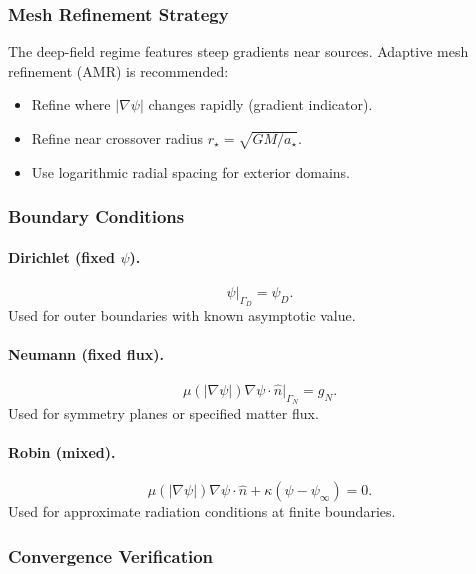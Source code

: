\subsubsection{Mesh Refinement Strategy}

The deep-field regime features steep gradients near sources. Adaptive mesh 
refinement (AMR) is recommended:
\begin{itemize}
\item Refine where $|\nabla\psi|$ changes rapidly (gradient indicator).
\item Refine near crossover radius $r_\star = \sqrt{GM/a_\star}$.
\item Use logarithmic radial spacing for exterior domains.
\end{itemize}

\subsubsection{Boundary Conditions}

\paragraph{Dirichlet (fixed $\psi$).}
\begin{equation}
\psi|_{\Gamma_D} = \psi_D.
\end{equation}
Used for outer boundaries with known asymptotic value.

\paragraph{Neumann (fixed flux).}
\begin{equation}
\mu(|\nabla\psi|)\nabla\psi \cdot \hat{n}|_{\Gamma_N} = g_N.
\end{equation}
Used for symmetry planes or specified matter flux.

\paragraph{Robin (mixed).}
\begin{equation}
\mu(|\nabla\psi|)\nabla\psi \cdot \hat{n} + \kappa(\psi - \psi_\infty) = 0.
\end{equation}
Used for approximate radiation conditions at finite boundaries.

\subsubsection{Convergence Verification}

